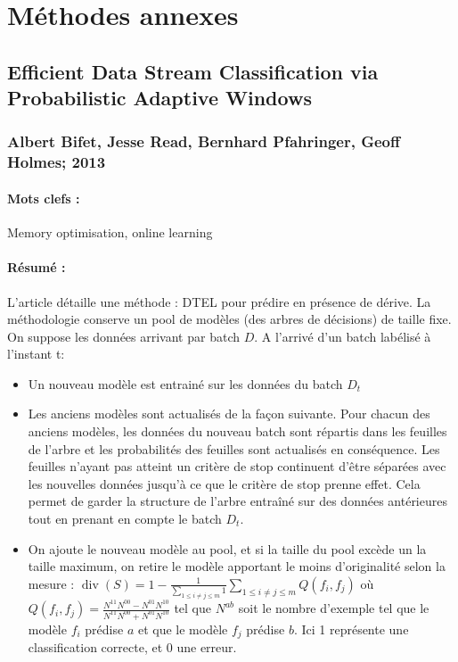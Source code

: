 \documentclass[11pt,a4paper]{report}
\begin{document}
\newpage


















\section{Méthodes annexes}

\subsection{Efficient Data Stream Classification via Probabilistic Adaptive Windows}
\subsubsection{Albert Bifet, Jesse Read, Bernhard Pfahringer, Geoff Holmes; 2013}

\paragraph{Mots clefs :}Memory optimisation, online learning 

\paragraph{Résumé :} L'article détaille une méthode : DTEL pour prédire en présence de dérive. La méthodologie conserve un pool de modèles (des arbres de décisions) de taille fixe. On suppose les données arrivant par batch $D$. 
A l'arrivé d'un batch labélisé à l'instant t: 
\begin{itemize}
	\item Un nouveau modèle est entrainé sur les données du batch $D_t$
	\item Les anciens modèles sont actualisés de la façon suivante. Pour chacun des anciens modèles, les données du nouveau batch sont répartis dans les feuilles de l'arbre et les probabilités des feuilles sont actualisés en conséquence. Les feuilles n'ayant pas atteint un critère de stop continuent d'être séparées avec les nouvelles données jusqu'à ce que le critère de stop prenne effet. Cela permet de garder la structure de l'arbre entraîné sur des données antérieures tout en prenant en compte le batch $D_t$.
	\item  On ajoute le nouveau modèle au pool, et si la taille du pool excède un la taille maximum, on retire le modèle apportant le moins d'originalité selon la mesure : $\operatorname{div}(S)=1-\frac{1}{\sum_{1 \leq i \neq j \leq m} 1} \sum_{1 \leq i \neq j \leq m} Q\left(f_{i}, f_{j}\right)$ où $Q\left(f_{i}, f_{j}\right)=\frac{N^{11} N^{00}-N^{01} N^{10}}{N^{11} N^{00}+N^{01} N^{10}}$ tel que $N^{ab}$ soit le nombre d'exemple tel que le modèle $f_i$ prédise $a$ et que le modèle $f_j$ prédise $b$. Ici 1 représente une classification correcte, et 0 une erreur.
\end{itemize}
\end{document}
